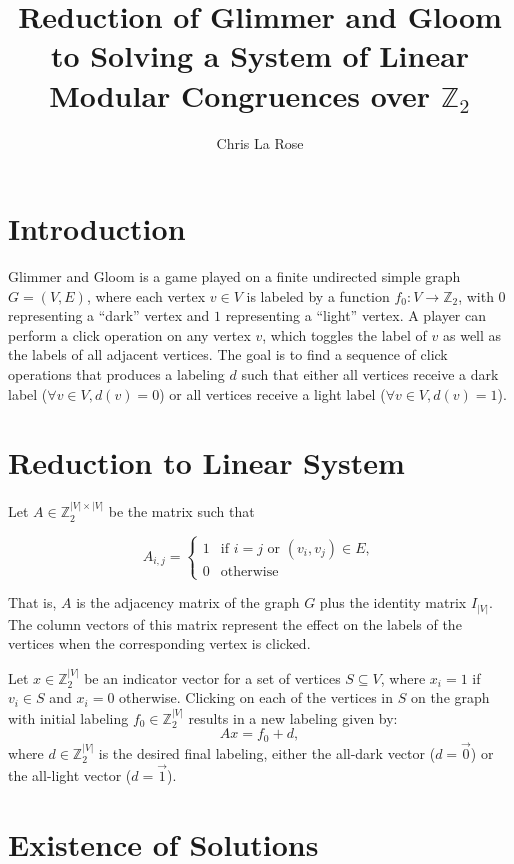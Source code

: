 \documentclass{article}
\title{Reduction of Glimmer and Gloom to Solving a System of Linear Modular Congruences over \(\mathbb{Z}_2\)}
\author{Chris La Rose}
\begin{document}
\maketitle

\section{Introduction}

Glimmer and Gloom is a game played on a finite undirected simple graph \( G = (V, E) \), where each vertex \( v \in V \) is labeled by a function \( f_0: V \to \mathbb{Z}_2 \), with \( 0 \) representing a ``dark'' vertex and \( 1 \) representing a ``light'' vertex. A player can perform a click operation on any vertex \( v \), which toggles the label of \( v \) as well as the labels of all adjacent vertices. The goal is to find a sequence of click operations that produces a labeling \( d \) such that either all vertices receive a dark label (\(\forall v \in V, d(v) = 0 \)) or all vertices receive a light label (\( \forall v \in V, d(v) = 1 \)).

\section{Reduction to Linear System}

Let \( A \in \mathbb{Z}_2^{|V| \times |V|} \) be the matrix such that

\[
  A_{i,j} =
  \begin{cases}
        1 & \text{if } i = j \text{ or } (v_i, v_j) \in E, \\
        0 & \text{otherwise}
  \end{cases}
\]

That is, \( A \) is the adjacency matrix of the graph \( G \) plus the identity matrix \( I_{|V|} \). The column vectors of this matrix represent the effect on the labels of the vertices when the corresponding vertex is clicked.

Let  \( x \in \mathbb{Z}_2^{|V|} \) be an indicator vector for a set of vertices \( S \subseteq V \), where \( x_i = 1 \) if \( v_i \in S \) and \( x_i = 0 \) otherwise. Clicking on each of the vertices in \( S \) on the graph with initial labeling \( f_0 \in \mathbb{Z}_2^{|V|} \) results in a new labeling given by:
\[
    A x = f_0 + d,
\]
where \( d \in \mathbb{Z}_2^{|V|} \) is the desired final labeling, either the all-dark vector (\( d = \vec{0} \)) or the all-light vector (\( d = \vec{1} \)).

\section{Existence of Solutions}
\end{document}
